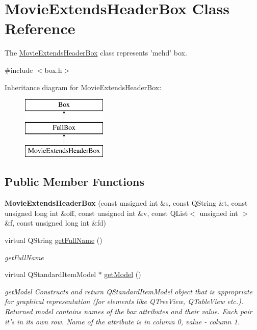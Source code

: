 \hypertarget{class_movie_extends_header_box}{\section{Movie\-Extends\-Header\-Box Class Reference}
\label{class_movie_extends_header_box}
}


The \hyperlink{class_movie_extends_header_box}{Movie\-Extends\-Header\-Box} class represents 'mehd' box.  




{\ttfamily \#include $<$box.\-h$>$}

Inheritance diagram for Movie\-Extends\-Header\-Box\-:\begin{figure}[H]
\begin{center}
\leavevmode
\includegraphics[height=3.000000cm]{class_movie_extends_header_box}
\end{center}
\end{figure}
\subsection*{Public Member Functions}
\begin{DoxyCompactItemize}
\item 
\hypertarget{class_movie_extends_header_box_a22ba65276ec50ac74de46d0e5eb3e490}{{\bfseries Movie\-Extends\-Header\-Box} (const unsigned int \&s, const Q\-String \&t, const unsigned long int \&off, const unsigned int \&v, const Q\-List$<$ unsigned int $>$ \&f, const unsigned long int \&fd)}\label{class_movie_extends_header_box_a22ba65276ec50ac74de46d0e5eb3e490}

\item 
virtual Q\-String \hyperlink{class_movie_extends_header_box_a04b51a9cf075645ba21dcaaa619407c9}{get\-Full\-Name} ()
\begin{DoxyCompactList}\small\item\em get\-Full\-Name \end{DoxyCompactList}\item 
virtual Q\-Standard\-Item\-Model $\ast$ \hyperlink{class_movie_extends_header_box_adaeb21e662a49f852651f706af1b683a}{get\-Model} ()
\begin{DoxyCompactList}\small\item\em get\-Model Constructs and return Q\-Standard\-Item\-Model object that is appropriate for graphical representation (for elements like Q\-Tree\-View, Q\-Table\-View etc.). Returned model contains names of the box attributes and their value. Each pair it's in its own row. Name of the attribute is in column 0, value -\/ column 1. \end{DoxyCompactList}\end{DoxyCompactItemize}
